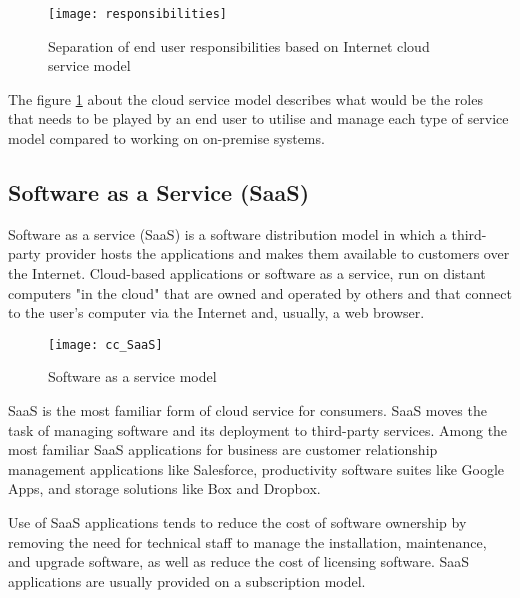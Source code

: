 \begin{figure}[H]
	\begin{center}
		\texttt{[image: responsibilities]}
		\caption{Separation of end user responsibilities based on Internet cloud service model}
		\label{fig:responsibilities}
	\end{center}
	\vspace{-10pt}
\end{figure}

The figure \ref{fig:responsibilities} about the cloud service model describes what would be the roles that needs to be played by an end user to utilise and manage each type of service model compared to working on on-premise systems.

\subsection{Software as a Service (SaaS)}\label{ssec:SaaS}
Software as a service (SaaS) is a software distribution model in which a third-party provider hosts the applications and makes them available to customers over the Internet. Cloud-based applications or software as a service, run on distant computers "in the cloud" that are owned and operated by others and that connect to the user's computer via the Internet and, usually, a web browser.

\begin{figure}[H]
	\begin{center}
		\texttt{[image: cc\_SaaS]}
		\caption{Software as a service model\cite{IBMcloud:SaaS}}
		\label{fig:cc_SaaS}
	\end{center}
	\vspace{-10pt}
\end{figure}

SaaS is the most familiar form of cloud service for consumers. SaaS moves the task of managing software and its deployment to third-party services. Among the most familiar SaaS applications for business are customer relationship management applications like Salesforce, productivity software suites like Google Apps, and storage solutions like Box and Dropbox.

Use of SaaS applications tends to reduce the cost of software ownership by removing the need for technical staff to manage the installation, maintenance, and upgrade software, as well as reduce the cost of licensing software. SaaS applications are usually provided on a subscription model.

